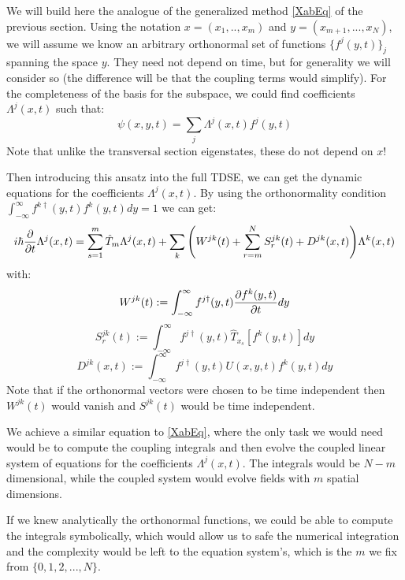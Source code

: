 \documentclass[11pt, a4paper]{article} %
\begin{document}
We will build here the analogue of the generalized method \eqref{XabEq} of the previous section. Using the notation $x=(x_1,..,x_m)$ and $y=(x_{m+1},...,x_N)$, we will assume we know an arbitrary orthonormal set of functions $\{ f^j(y,t) \}_j$ spanning the space $y$. They need not depend on time, but for generality we will consider so (the difference will be that the coupling terms would simplify). For the completeness of the basis for the subspace, we could find coefficients $\Lambda^j(x,t)$ such that:
\begin{equation}
\psi(x,y,t)=\sum_j \Lambda^j(x,t) f^j(y,t)
\end{equation}
Note that unlike the transversal section eigenstates, these do not depend on $x$!

Then introducing this ansatz into the full TDSE, we can get the dynamic equations for the coefficients $\Lambda^j(x,t)$. By using the orthonormality condition $\int_{-\infty}^{\infty}f^{k\dagger}(y,t)f^k(y,t)dy=1$ we can get:
\begin{equation}
i\hbar \pdv{}{t}\Lambda^j(x,t)= \sum_{s=1}^m \hat{T}_m \Lambda^j(x,t) + \sum_k \qty( W^{jk}(t)+\sum_{r=m}^NS^{jk}_r(t)+D^{jk}(x,t) )\Lambda^k(x,t)
\end{equation}
with:
\begin{equation}
W^{jk}(t):=\int_{-\infty}^{\infty}f^{j\dagger}(y,t) \pdv{f^k(y,t)}{t} dy
\end{equation}
\begin{equation}
S^{jk}_r(t):=\int_{-\infty}^{\infty}f^{j\dagger}(y,t) \hat{T}_{x_s}[f^k(y,t)] dy
\end{equation}
\begin{equation}
D^{jk}(x,t):=\int_{-\infty}^{\infty}f^{j\dagger}(y,t)U(x,y,t) f^k(y,t) dy
\end{equation}
Note that if the orthonormal vectors were chosen to be time independent then $W^{jk}(t)$ would vanish and $S^{jk}(t)$ would be time independent. 

We achieve a similar equation to \eqref{XabEq}, where the only task we would need would be to compute the coupling integrals and then evolve the coupled linear system of equations for the coefficients $\Lambda^j(x,t)$. The integrals would be $N-m$ dimensional, while the coupled system would evolve fields with $m$ spatial dimensions. 

If we knew analytically the orthonormal functions, we could be able to compute the integrals symbolically, which would allow us to safe the numerical integration and the complexity would be left to the equation system's, which is the $m$ we fix from $\{0,1,2,...,N\}$.
\end{document}

